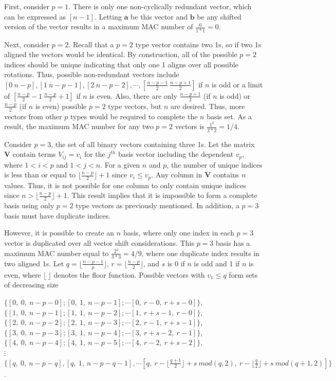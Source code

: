 \documentclass[3p,times]{elsarticle}
\begin{document}
First, consider $p=1$.  There is only one non-cyclically redundant vector, which can be expressed as $\left[n-1\right]$.  
Letting $\textbf{a}$ be this vector and $\textbf{b}$ be any shifted version of the vector results in a maximum MAC number of $\frac{0}{1*1}=0$.

Next, consider $p=2$.  Recall that a $p=2$ type vector contains two 1s, so if two 1s aligned the vectors would be identical.  
By construction, all of the possible $p=2$ indices should be unique indicating that only one 1 aligns over all possible rotations.
Thus, possible non-redundant vectors include $[0\ n-p], [1\  n-p-1], [2\ n-p-2], \cdots, [\frac{n-p-1}{2}\ \frac{n-p+1}{2}]$ if $n$ is odd or a limit of $[\frac{n-p}{2}-1\ \frac{n-p}{2}+1]$ if $n$ is even.    
Also, there are only $\frac{n-p+1}{2}$ (if $n$ is odd) or $\frac{n-p}{2}$ (if $n$ is even) possible $p=2$ type vectors, but $n$ are desired.  
Thus, more vectors from other $p$ types would be required to complete the $n$ basis set.    
As a result, the maximum MAC number for any two $p=2$ vectors is $\frac{1^2}{2*2}=1/4$.

Consider $p=3$, the set of all binary vectors containing three 1s.  
Let the matrix $\textbf{V}$ contain terms $V_{ij}=v_i$ for the $j^{th}$ basis vector including the dependent $v_p$, where $1<i<p$ and $1<j<n$.
For a given $n$ and $p$, the number of unique indices is less than or equal to $\lfloor \frac{n-p}{2}\rfloor+1$ since $v_i\le v_p$.  
Any column in $\textbf{V}$ contains $n$ values.  Thus, it is not possible for one column to only contain unique indices since $n>\lfloor \frac{n-p}{2}\rfloor+1$.
This result implies that it is impossible to form a complete basis using only $p=2$ type vectors as previously mentioned.  In addition, a $p=3$ basis must have
duplicate indices.

However, it is possible to create an $n$ basis, where only one index in each $p=3$ vector is duplicated over all vector shift considerations.  
This $p=3$ basis has a maximum MAC number equal to $\frac{2^2}{3*3}=4/9$, where one duplicate index results in two aligned 1s.
Let $q=\lfloor\frac{n-p-1}{p}\rfloor$, $r=\lfloor\frac{n-p}{2}\rfloor$, and $s$ is 0 if $n$ is odd and 1 if $n$ is even, where $\lfloor\ \rfloor$ denotes the floor function.
Possible vectors with $v_1\le q$ form sets of decreasing size

\begin{center}
$\{[0,\ 0,\ n-p-0]; [0,\ 1,\ n-p-1]; \cdots [0,\ r-0,\ r+s-0]\}$,\\
$\{[1,\ 0,\ n-p-1]; [1,\ 1,\ n-p-2]; \cdots [1,\ r+s-1,\ r-0]\}$,\\
$\{[2,\ 0,\ n-p-2]; [2,\ 1,\ n-p-3]; \cdots [2,\ r-1,\ r+s-1]\}$,\\
$\{[3,\ 0,\ n-p-3]; [3,\ 1,\ n-p-4]; \cdots [3,\ r+s-2,\ r-1]\}$,\\
$\{[4,\ 0,\ n-p-4]; [4,\ 1,\ n-p-5]; \cdots [4,\ r-2,\ r+s-2]\}$,\\
$\vdots$ \\
$\{[q,\ 0,\ n-p-q], [q,\ 1,\ n-p-q-1], \cdots [q,\ r-\lfloor \frac{q+1}{2}\rfloor+s\ mod(q,2),\ r-\lfloor \frac{q}{2}\rfloor+s\ mod(q+1,2)]\}$.
\end{center}
\end{document}
